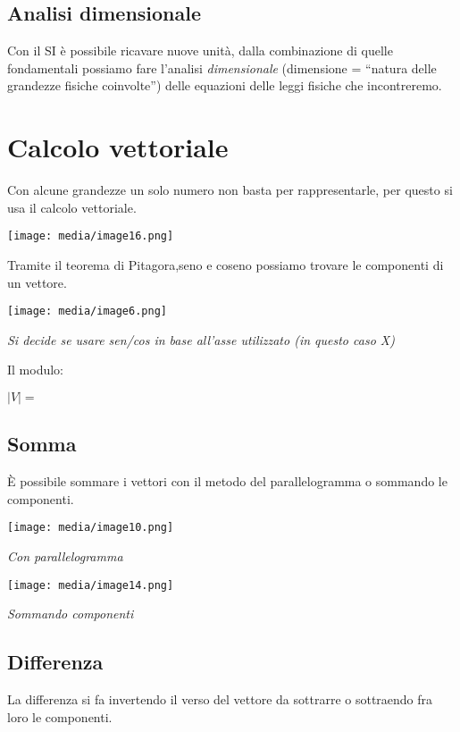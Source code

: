 \subsection{Analisi dimensionale}\label{analisi-dimensionale}

Con il SI è possibile ricavare nuove unità, dalla combinazione di quelle
fondamentali possiamo fare l'analisi \emph{dimensionale} (dimensione =
``natura delle grandezze fisiche coinvolte'') delle equazioni delle
leggi fisiche che incontreremo.

\section{Calcolo vettoriale}\label{calcolo-vettoriale}

Con alcune grandezze un solo numero non basta per rappresentarle, per
questo si usa il calcolo vettoriale.

\texttt{[image: media/image16.png]}

Tramite il teorema di Pitagora,seno e coseno possiamo trovare le
componenti di un vettore.

\texttt{[image: media/image6.png]}

\emph{Si decide se usare sen/cos in base all'asse utilizzato (in questo
caso X)}

Il modulo:

\(|V| =\)

\subsection{Somma}\label{somma}

È possibile sommare i vettori con il metodo del parallelogramma o
sommando le componenti.

\texttt{[image: media/image10.png]}

\emph{Con parallelogramma}

\texttt{[image: media/image14.png]}

\emph{Sommando componenti}

\subsection{Differenza}\label{differenza}

La differenza si fa invertendo il verso del vettore da sottrarre o
sottraendo fra loro le componenti.

